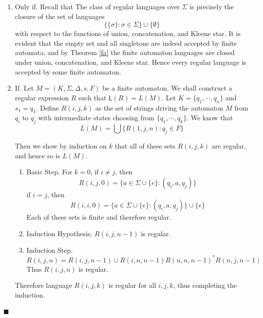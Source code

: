 \documentclass[aps,pra,onecolumn,notitlepage,superscriptaddress]{revtex4-1}
\newcommand{\Lan}{\mathsf{L}}
\def\qed{$\blacksquare$ \newline}
\begin{document}
    \begin{enumerate}
        \item Only if. Recall that The class of regular languages over $\Sigma$ is precisely the closure of the set of languages
        \begin{equation*}
            \{ \{ \sigma \} : \sigma \in \Sigma \} \cup \{ \emptyset \}
        \end{equation*}
        with respect to the functions of union, concatenation, and Kleene star. It is evident that the empty set and all singletons are indeed accepted by finite automata; and by Theorem \ref{fa} the finite automaton languages are closed under union, concatenation, and Kleene star. Hence every regular language is accepted by some finite automaton.
        \item If. Let $M = (K, \Sigma, \Delta, s, F)$ be a finite automaton. We shall construct a regular expression $R$ such that $\Lan(R) = L(M)$. Let $K = \{q_1, \cdots, q_n\}$ and $s_1 = q_1$.
        Define $R(i,j,k)$ as the set of strings driving the automaton $M$ from $q_i$ to $q_j$ with intermediate states choosing from $\{q_1, \cdots, q_k\}$. We know that
    \begin{equation}
        L(M) = \bigcup \{ R(1,j,n) : q_j \in F \}
    \end{equation}

    Then we show by induction on $k$ that all of these sets $R(i,j,k)$ are regular, and hence so is $L(M)$.
    \begin{enumerate}
        \item Basic Step. For $k = 0$, if $i \neq j$, then
        \begin{equation*}
            R(i,j,0) = \{ a \in \Sigma \cup \{ e \} : (q_i,a,q_j) \}
        \end{equation*}
        if $i=j$, then
        \begin{equation*}
            R(i,i,0) = \{ a \in \Sigma \cup \{ e \} : (q_i,a,q_j) \} \cup \{ e \}
        \end{equation*}
        Each of these sets is finite and therefore regular.

        \item Induction Hypothesis. $R(i,j,n-1)$ is regular.

        \item Induction Step. 
        \begin{equation*}
            R(i,j,n) = R(i,j,n-1) \cup R(i,n,n-1)R(n,n,n-1)^*R(n,j,n-1)
        \end{equation*}
        Thus $R(i,j,n)$ is regular.
    \end{enumerate}
    
    Therefore language $R(i,j,k)$ is regular for all $i, j, k$, thus completing the induction.
    \end{enumerate}\qed
    
\end{document}

